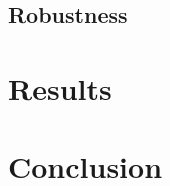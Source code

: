 \documentclass{article}
\begin{document}
\subsection{Robustness}


\section{Results}


\section{Conclusion}
\end{document}
